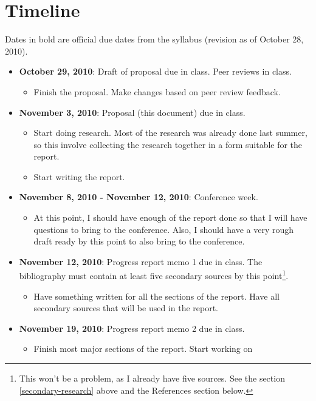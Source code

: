 \documentclass[12pt]{article}
\begin{document}
\section{Timeline}
Dates in bold are official due dates from the syllabus (revision as of
October 28, 2010).

\begin{itemize}
\item \textbf{October 29, 2010}: Draft of proposal due
in class.  Peer reviews in class.
    \begin{itemize}
    \item Finish the proposal.  Make changes based on peer review
    feedback.
    \end{itemize}
\item \textbf{November 3, 2010}: Proposal (this document) due in class. 
    \begin{itemize}
    \item Start doing research.  Most of the research was already done
    last summer, so this involve collecting the research together in a
    form suitable for the report.
    \item Start writing the report.  
    \end{itemize}
\item \textbf{November 8, 2010 - November 12, 2010}: Conference week. 
    \begin{itemize}
    \item At this point, I should have enough of the report done so that
    I will have questions to bring to the conference.  Also, I should
    have a very rough draft ready by this point to also bring to the
    conference.
    \end{itemize}
\item \textbf{November 12, 2010}: Progress report memo 1 due in class. 
The bibliography must contain at least five secondary sources by this
point\footnote{This won't be a problem, as I already have five sources. 
See the section \ref{secondary-research} above and the References
section below.}.
    \begin{itemize}
    \item Have something written for all the sections of the report. 
    Have all secondary sources that will be used in the report.
    \end{itemize}
\item \textbf{November 19, 2010}: Progress report memo 2 due in class.
    \begin{itemize}
    \item Finish most major sections of the report.  Start working on

\end{itemize}
\end{itemize}
\end{document}
